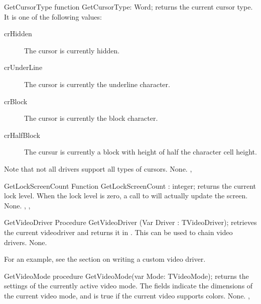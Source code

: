 
\begin{function}{GetCursorType}
\Declaration
function GetCursorType: Word; 
\Description
{} returns the current cursor type. It is one of the
following values: 
\begin{description}
\item[crHidden] The cursor is currently hidden.
\item[crUnderLine] The cursor is currently the underline character.
\item[crBlock] The cursor is currently the block character.
\item[crHalfBlock] The cursur is currently a block with height of half the
character cell height.
\end{description}
Note that not all drivers support all types of cursors.
\Errors
None.
\SeeAlso
{}, 
\end{function}


\begin{function}{GetLockScreenCount}
\Declaration
Function GetLockScreenCount : integer;
\Description
{} returns the current lock level. When the lock
level is zero, a call to  will actually update the
screen.
\Errors
None.
\SeeAlso
{}, , 
\end{function}


\begin{procedure}{GetVideoDriver}
\Declaration
Procedure GetVideoDriver (Var Driver : TVideoDriver);
\Declaration
{} retrieves the current videodriver and returns it in
. This can be used to chain video drivers.
\Errors
None.
\SeeAlso
{}
\end{procedure}

For an example, see the section on writing a custom video driver.

\begin{procedure}{GetVideoMode}
\Declaration
procedure GetVideoMode(var Mode: TVideoMode); 
\Description
{} returns the settings of the currently active video mode.
The  fields indicate the dimensions of the current video mode,
and  is true if the current video supports colors.
\Errors
None.
\SeeAlso
{}, 
\end{procedure}

